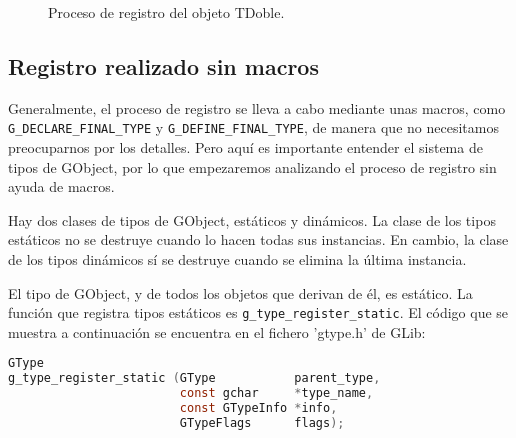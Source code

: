\begin{figure}[ht]
 \caption{Proceso de registro del objeto \textsf{TDoble}.}
 \label{fig:proceso-registro}
\end{figure}

\subsection{Registro realizado sin macros}
Generalmente, el proceso de registro se lleva a cabo mediante unas macros, como
\texttt{G\_DECLARE\_FINAL\_TYPE} y \texttt{G\_DEFINE\_FINAL\_TYPE}, de manera que no
necesitamos preocuparnos por los detalles. Pero aquí es importante entender el
sistema de tipos de \textsf{GObject}, por lo que empezaremos analizando el proceso
de registro sin ayuda de macros.

Hay dos clases de tipos de \textsf{GObject}, estáticos y dinámicos.
La clase de los tipos estáticos no se destruye cuando lo hacen todas sus instancias.
En cambio, la clase de los tipos dinámicos sí se destruye cuando se elimina la última instancia.

El tipo de \textsf{GObject}, y de todos los objetos que derivan de él, es estático.
La función que registra tipos estáticos es \texttt{g\_type\_register\_static}.
El código que se muestra a continuación se encuentra en el fichero '\textsf{gtype.h}' de
\textsf{GLib}:
\begin{lstlisting}[language=C]
GType
g_type_register_static (GType           parent_type,
                        const gchar     *type_name,
                        const GTypeInfo *info,
                        GTypeFlags      flags);
\end{lstlisting}

